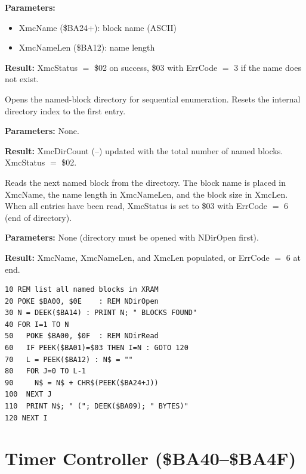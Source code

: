 \textbf{Parameters:}
\begin{itemize}
  \item XmcName (\$BA24+): block name (ASCII)
  \item XmcNameLen (\$BA12): name length
\end{itemize}

\textbf{Result:} XmcStatus $=$ \$02 on success, \$03 with ErrCode $=$ 3
if the name does not exist.

\medskip


Opens the named-block directory for sequential enumeration.  Resets the
internal directory index to the first entry.

\textbf{Parameters:} None.

\textbf{Result:} XmcDirCount (--) updated with the
total number of named blocks.  XmcStatus $=$ \$02.

\medskip


Reads the next named block from the directory.  The block name is placed
in XmcName, the name length in XmcNameLen, and the block size in XmcLen.
When all entries have been read, XmcStatus is set to \$03 with ErrCode
$=$ 6 (end of directory).

\textbf{Parameters:} None (directory must be opened with NDirOpen first).

\textbf{Result:} XmcName, XmcNameLen, and XmcLen populated, or ErrCode
$=$ 6 at end.

\begin{lstlisting}
10 REM list all named blocks in XRAM
20 POKE $BA00, $0E    : REM NDirOpen
30 N = DEEK($BA14) : PRINT N; " BLOCKS FOUND"
40 FOR I=1 TO N
50   POKE $BA00, $0F  : REM NDirRead
60   IF PEEK($BA01)=$03 THEN I=N : GOTO 120
70   L = PEEK($BA12) : N$ = ""
80   FOR J=0 TO L-1
90     N$ = N$ + CHR$(PEEK($BA24+J))
100  NEXT J
110  PRINT N$; " ("; DEEK($BA09); " BYTES)"
120 NEXT I
\end{lstlisting}


\section{Timer Controller (\$BA40--\$BA4F)}
\label{sec:timer}

